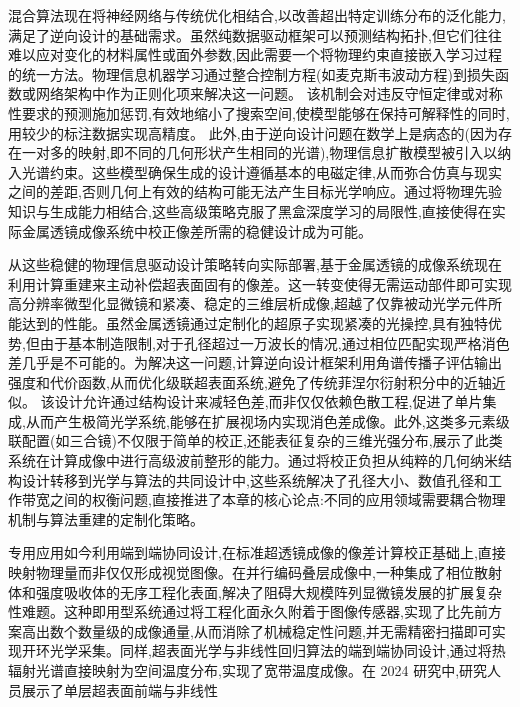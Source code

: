 \documentclass[11pt]{article}
\begin{document}
混合算法现在将神经网络与传统优化相结合,以改善超出特定训练分布的泛化能力,满足了逆向设计的基础需求。虽然纯数据驱动框架可以预测结构拓扑,但它们往往难以应对变化的材料属性或面外参数,因此需要一个将物理约束直接嵌入学习过程的统一方法。物理信息机器学习通过整合控制方程(如麦克斯韦波动方程)到损失函数或网络架构中作为正则化项来解决这一问题。\citep{doi_10_21070_acopen_10_2025_12939_5a404b4e} \citep{doi_10_1109_tmtt_2026_3658422_94a01e71} 该机制会对违反守恒定律或对称性要求的预测施加惩罚,有效地缩小了搜索空间,使模型能够在保持可解释性的同时,用较少的标注数据实现高精度。\citep{doi_10_71465_fapm546_bda368a5} 此外,由于逆向设计问题在数学上是病态的(因为存在一对多的映射,即不同的几何形状产生相同的光谱),物理信息扩散模型被引入以纳入光谱约束。这些模型确保生成的设计遵循基本的电磁定律,从而弥合仿真与现实之间的差距,否则几何上有效的结构可能无法产生目标光学响应。通过将物理先验知识与生成能力相结合,这些高级策略克服了黑盒深度学习的局限性,直接使得在实际金属透镜成像系统中校正像差所需的稳健设计成为可能。\citep{doi_10_1002_adom_202100548_6789fa4c} \citep{doi_10_1002_adpr_202300158_66d61883} \citep{doi_10_71465_fapm546_bda368a5}

从这些稳健的物理信息驱动设计策略转向实际部署,基于金属透镜的成像系统现在利用计算重建来主动补偿超表面固有的像差。这一转变使得无需运动部件即可实现高分辨率微型化显微镜和紧凑、稳定的三维层析成像,超越了仅靠被动光学元件所能达到的性能。虽然金属透镜通过定制化的超原子实现紧凑的光操控,具有独特优势,但由于基本制造限制,对于孔径超过一万波长的情况,通过相位匹配实现严格消色差几乎是不可能的。为解决这一问题,计算逆向设计框架利用角谱传播子评估输出强度和代价函数,从而优化级联超表面系统,避免了传统菲涅尔衍射积分中的近轴近似。\citep{doi_10_1364_oe_448757_33bdf93c} \citep{doi_10_1002_lpor_202401011_3926c17d} 该设计允许通过结构设计来减轻色差,而非仅仅依赖色散工程,促进了单片集成,从而产生极简光学系统,能够在扩展视场内实现消色差成像。此外,这类多元素级联配置(如三合镜)不仅限于简单的校正,还能表征复杂的三维光强分布,展示了此类系统在计算成像中进行高级波前整形的能力。通过将校正负担从纯粹的几何纳米结构设计转移到光学与算法的共同设计中,这些系统解决了孔径大小、数值孔径和工作带宽之间的权衡问题,直接推进了本章的核心论点:不同的应用领域需要耦合物理机制与算法重建的定制化策略。\citep{doi_10_3788_pi_2023_c01_9f71817a} \citep{doi_10_1364_oe_27_030308_704a1c9b} \citep{doi_10_1038_s41377_026_02272_y_42e58df2}

专用应用如今利用端到端协同设计,在标准超透镜成像的像差计算校正基础上,直接映射物理量而非仅仅形成视觉图像。在并行编码叠层成像中,一种集成了相位散射体和强度吸收体的无序工程化表面,解决了阻碍大规模阵列显微镜发展的扩展复杂性难题。这种即用型系统通过将工程化面永久附着于图像传感器,实现了比先前方案高出数个数量级的成像通量,从而消除了机械稳定性问题,并无需精密扫描即可实现开环光学采集。同样,超表面光学与非线性回归算法的端到端协同设计,通过将热辐射光谱直接映射为空间温度分布,实现了宽带温度成像。在 2024 研究中,研究人员展示了单层超表面前端与非线性
\end{document}
